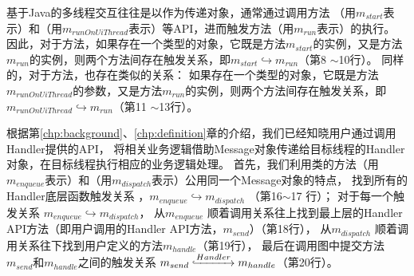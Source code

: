 基于Java的多线程交互往往是以作为传递对象，通常通过调用方法 （用$m_{start}$表示）和（用$m_{runOnUiThread}$表示）等API，进而触发方法（用$m_{run}$表示）的执行。
因此，对于方法，如果存在一个类型的对象，它既是方法$m_{start}$的实例，又是方法$m_{run}$的实例，则两个方法间存在触发关系，即$m_{start} \hookrightarrow m_{run}$（第8 $\sim$10行）。
同样的，对于方法，也存在类似的关系：
如果存在一个类型的对象，它既是方法$m_{runOnUiThread}$的参数，又是方法$m_{run}$的实例，则两个方法间存在触发关系，即$m_{runOnUiThread} \hookrightarrow m_{run}$（第11 $\sim$13行）。










根据第\ref{chp:background}、\ref{chp:definition}章的介绍，我们已经知晓用户通过调用Handler提供的API，
将相关业务逻辑借助Message对象传递给目标线程的Handler对象，在目标线程执行相应的业务逻辑处理。
首先，我们利用类的方法（用$m_{enqueue}$表示）和（用$m_{dispatch}$表示）公用同一个Message对象的特点，
找到所有的Handler底层函数触发关系 ，$m_{enqueue}  \hookrightarrow  m_{dispatch}$ （第16$\sim$17 行）；
对于每一个触发关系 $m_{enqueue}  \hookrightarrow  m_{dispatch}$，
从$m_{enqueue}$ 顺着调用关系往上找到最上层的Handler API方法（即用户调用的Handler API方法，$m_{send}$）（第18行），
从$m_{dispatch}$ 顺着调用关系往下找到用户定义的方法$m_{handle}$（第19行），
最后在调用图中提交方法$m_{send}$和$m_{handle}$之间的触发关系 $m_{send} \lhook\joinrel\xrightarrow{Handler} m_{handle}$（第20行）。


